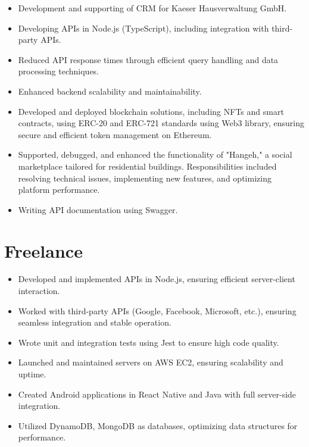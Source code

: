 \documentclass[11pt,a4paper]{moderncv}
\begin{document}
  {{}
   \begin{itemize}
     \item Development and supporting of CRM for Kaeser Hausverwaltung GmbH.
     \item Developing APIs in Node.js (TypeScript), including integration with third-party APIs.
     \item Reduced API response times through efficient query handling and data processing techniques.
     \item Enhanced backend scalability and maintainability.
   \end{itemize}}
  {{}
  \begin{itemize}
     \item Developed and deployed blockchain solutions, including NFTs and smart contracts, using ERC-20 and ERC-721 standards using Web3 library, ensuring secure and efficient token management on Ethereum.
     \item Supported, debugged, and enhanced the functionality of "Hangeh," a social marketplace tailored for residential buildings. Responsibilities included resolving technical issues, implementing new features, and optimizing platform performance.
     \item Writing API documentation using Swagger.
  \end{itemize}}

\section{Freelance}

  {{}
   \begin{itemize}
     \item Developed and implemented APIs in Node.js, ensuring efficient server-client interaction.
     \item Worked with third-party APIs (Google, Facebook, Microsoft, etc.), ensuring seamless integration and stable operation.
     \item Wrote unit and integration tests using Jest to ensure high code quality.
     \item Launched and maintained servers on AWS EC2, ensuring scalability and uptime.
     \item Created Android applications in React Native and Java with full server-side integration.
     \item Utilized DynamoDB, MongoDB as databases, optimizing data structures for performance.
   \end{itemize}}
\end{document}
